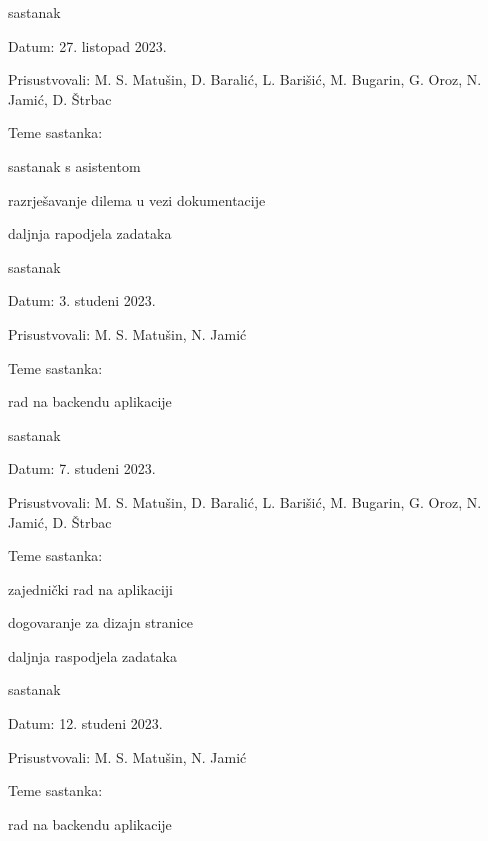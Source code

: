 \begin{packed_enum}
			\item  sastanak
			\item[] \begin{packed_item}
				\item Datum: 27. listopad 2023.
				\item Prisustvovali: M. S. Matušin, D. Baralić, L. Barišić, M. Bugarin, G. Oroz, N. Jamić, D. Štrbac
				\item Teme sastanka:
				\begin{packed_item}
					\item  sastanak s asistentom
					\item  razrješavanje dilema u vezi dokumentacije
					\item daljnja rapodjela zadataka
				\end{packed_item}
			\end{packed_item}
			
			\item  sastanak
			\item[] \begin{packed_item}
				\item Datum: 3. studeni 2023.
				\item Prisustvovali: M. S. Matušin, N. Jamić
				\item Teme sastanka:
				\begin{packed_item}
					\item  rad na backendu aplikacije
				\end{packed_item}
			\end{packed_item}
			
			\item  sastanak
			\item[] \begin{packed_item}
				\item Datum: 7. studeni 2023.
				\item Prisustvovali: M. S. Matušin, D. Baralić, L. Barišić, M. Bugarin, G. Oroz, N. Jamić, D. Štrbac
				\item Teme sastanka:
				\begin{packed_item}
					\item  zajednički rad na aplikaciji
					\item  dogovaranje za dizajn stranice
					\item daljnja raspodjela zadataka
				\end{packed_item}
			\end{packed_item}
			
			\item  sastanak
			\item[] \begin{packed_item}
				\item Datum: 12. studeni 2023.
				\item Prisustvovali: M. S. Matušin, N. Jamić
				\item Teme sastanka:
				\begin{packed_item}
					\item  rad na backendu aplikacije
				\end{packed_item}
			\end{packed_item}
		

\end{packed_enum}
